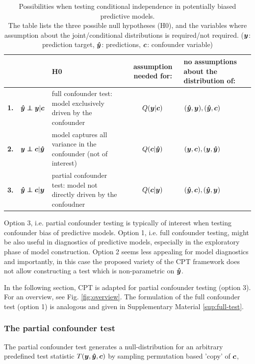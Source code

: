 \documentclass{article}
\begin{document}
\renewcommand{\arraystretch}{1.2}
\begin{table}[]
\centering
\begin{tabular}{l|rp{60mm}|c|>{\centering\arraybackslash}m{30mm}}
 &  & H0  & assumption needed for: & no assumptions about the distribution of: \\
\hline
\textbf{1.} & $\yhat \independent \y | \c$ \quad  & full confounder test: model exclusively driven by the confounder & $Q(\boldsymbol{y}|\boldsymbol{c})$ & $(\boldsymbol{\hat{y}},\boldsymbol{y}), (\boldsymbol{\hat{y}}, \boldsymbol{c})$ \\
\textbf{2.} & $\y \independent \c | \yhat$ \quad & model captures all variance in the confounder (not of interest) & $Q(\boldsymbol{c}|\boldsymbol{\hat{y}})$ & $(\boldsymbol{y}, \boldsymbol{c}), (\boldsymbol{y}, \boldsymbol{\hat{y}})$ \\
\textbf{3.} & $\yhat \independent \c | \y$  \quad &  partial confounder  test: model not directly driven by the confoudner & $Q(\boldsymbol{c}|\boldsymbol{y})$ & $(\boldsymbol{\hat{y}}, \boldsymbol{c}), (\boldsymbol{\hat{y}}, \boldsymbol{y})$ \\
\end{tabular}
\caption{\label{tab:conditional-independence-cases} Possibilities when testing conditional independence in potentially biased predictive models. \\The table lists the three possible null hypotheses (H0), and the variables where assumption about the joint/conditional distributions is required/not required.   ($\boldsymbol{y}$: prediction target, $\boldsymbol{\hat{y}}$: predictions, $\boldsymbol{c}$: confounder variable) }
\end{table}

Option 3, i.e. partial confounder testing is typically of interest when testing confounder bias of predictive models. Option 1, i.e. full confounder testing, might be also useful in diagnostics of predictive models, especially in the exploratory phase of model construction. Option 2 seems less appealing for model diagnostics and importantly, in this case the proposed variety of the CPT framework does not allow constructing a test which is non-parametric on $\boldsymbol{\hat{y}}$.

In the following section, CPT is adapted for partial confounder testing (option 3). For an overview, see Fig. \ref{fig:overview}. The formulation of the full confounder test (option 1) is analogous and given in Supplementary Material \ref{sup:full-test}.
\subsubsection*{The partial confounder test}

The partial confounder test generates a null-distribution for an arbitrary predefined test statistic $T(\boldsymbol{y},\boldsymbol{\hat{y}},\boldsymbol{c})$ by sampling permutation based 'copy' of $\boldsymbol{c}$,
\end{document}
